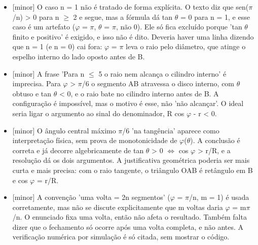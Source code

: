\documentclass{article}%
\begin{document}
\begin{itemize}%
\item%
{[}minor{]} O caso n = 1 não é tratado de forma explícita. O texto diz que sen($\pi$/n) > 0 para n $\geq$ 2 e segue, mas a fórmula dá tan $\theta$ = 0 para n = 1, e esse caso é um artefato ($\varphi$ = $\pi$, $\theta$ = $\pi$, não 0). Ele só fica excluído porque 'tan $\theta$ finito e positivo' é exigido, e isso não é dito. Deveria haver uma linha dizendo que n = 1 (e n = 0) cai fora: $\varphi$ = $\pi$ leva o raio pelo diâmetro, que atinge o espelho interno do lado oposto antes de B.%
\item%
{[}minor{]} A frase 'Para n $\leq$ 5 o raio nem alcança o cilindro interno' é imprecisa. Para $\varphi$ > $\pi$/6 o segmento AB atravessa o disco interno, com $\theta$ obtuso e tan $\theta$ < 0, e o raio bate no cilindro interno antes de B. A configuração é impossível, mas o motivo é esse, não 'não alcançar'. O ideal seria ligar o argumento ao sinal do denominador, R cos $\varphi$ - r < 0.%
\item%
{[}minor{]} O ângulo central máximo $\pi$/6 'na tangência' aparece como interpretação física, sem prova de monotonicidade de $\varphi$($\theta$). A conclusão é correta e já decorre algebricamente de tan $\theta$ > 0 $\Leftrightarrow$ cos $\varphi$ > r/R, e a resolução dá os dois argumentos. A justificativa geométrica poderia ser mais curta e mais precisa: com o raio tangente, o triângulo OAB é retângulo em B e cos $\varphi$ = r/R.%
\item%
{[}minor{]} A convenção 'uma volta = 2n segmentos' ($\varphi$ = $\pi$/n, m = 1) é usada corretamente, mas não se discute explicitamente que m voltas daria $\varphi$ = m$\pi$/n. O enunciado fixa uma volta, então não afeta o resultado. Também falta dizer que o fechamento só ocorre após uma volta completa, e não antes. A verificação numérica por simulação é só citada, sem mostrar o código.%
\end{itemize}%
\end{document}
